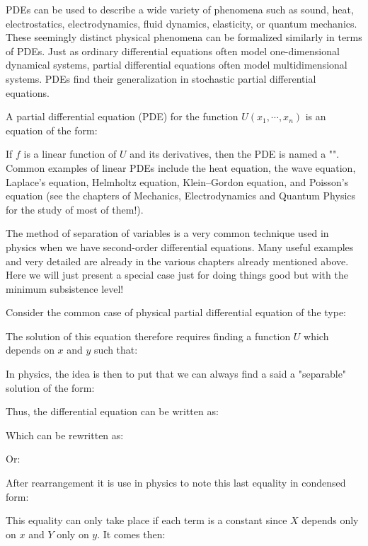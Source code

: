 	PDEs can be used to describe a wide variety of phenomena such as sound, heat, electrostatics, electrodynamics, fluid dynamics, elasticity, or quantum mechanics. These seemingly distinct physical phenomena can be formalized similarly in terms of PDEs. Just as ordinary differential equations often model one-dimensional dynamical systems, partial differential equations often model multidimensional systems. PDEs find their generalization in stochastic partial differential equations.
	
	A partial differential equation (PDE) for the function $U(x_{1},\cdots ,x_{n})$ is an equation of the form:
	
	If $f$ is a linear function of $U$ and its derivatives, then the PDE is named a "". Common examples of linear PDEs include the heat equation, the wave equation, Laplace's equation, Helmholtz equation, Klein–Gordon equation, and Poisson's equation (see the chapters of Mechanics, Electrodynamics and Quantum Physics for the study of most of them!).
	
	The method of separation of variables is a very common technique used in physics when we have second-order differential equations. Many useful examples and very detailed are already in the various chapters already mentioned above. Here we will just present a special case just for doing things good but with the minimum subsistence level!
	
	Consider the common case of physical partial differential equation of the type:
	
	The solution of this equation therefore requires finding a function $U$ which depends on $x$ and $y$ such that:
	
	In physics, the idea is then to put that we can always find a said a "separable" solution of the form:
	
	Thus, the differential equation can be written as:
	
	Which can be rewritten as:
	
	Or:
	
	After rearrangement it is use in physics to note this last equality in condensed form:
	
	This equality can only take place if each term is a constant since $X$ depends only on $x$ and $Y$ only on $y$. It comes then:
	
